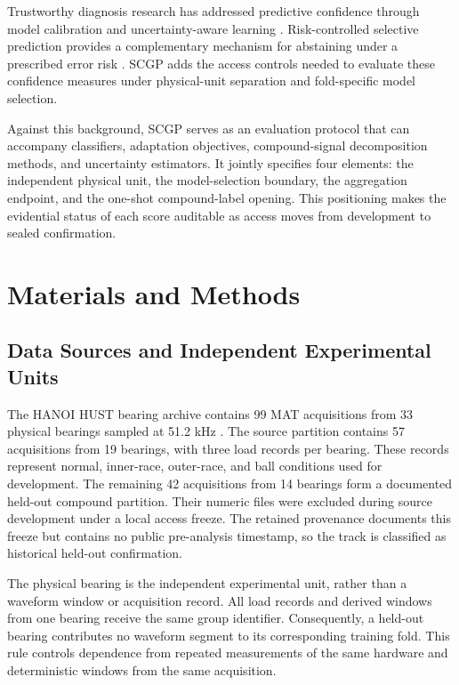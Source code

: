 \documentclass[machines,article,submit,oneauthor,pdftex]{Definitions/mdpi}
\begin{document}
Trustworthy diagnosis research has addressed predictive confidence through model calibration and uncertainty-aware learning \cite{r29,r30,r40}. Risk-controlled selective prediction provides a complementary mechanism for abstaining under a prescribed error risk \cite{r31}. SCGP adds the access controls needed to evaluate these confidence measures under physical-unit separation and fold-specific model selection.

Against this background, SCGP serves as an evaluation protocol that can accompany classifiers, adaptation objectives, compound-signal decomposition methods, and uncertainty estimators. It jointly specifies four elements: the independent physical unit, the model-selection boundary, the aggregation endpoint, and the one-shot compound-label opening. This positioning makes the evidential status of each score auditable as access moves from development to sealed confirmation.

\section{Materials and Methods}

\subsection{Data Sources and Independent Experimental Units}

The HANOI HUST bearing archive contains 99 MAT acquisitions from 33 physical bearings sampled at 51.2 kHz \cite{r01,r45}. The source partition contains 57 acquisitions from 19 bearings, with three load records per bearing. These records represent normal, inner-race, outer-race, and ball conditions used for development. The remaining 42 acquisitions from 14 bearings form a documented held-out compound partition. Their numeric files were excluded during source development under a local access freeze. The retained provenance documents this freeze but contains no public pre-analysis timestamp, so the track is classified as historical held-out confirmation.

The physical bearing is the independent experimental unit, rather than a waveform window or acquisition record. All load records and derived windows from one bearing receive the same group identifier. Consequently, a held-out bearing contributes no waveform segment to its corresponding training fold. This rule controls dependence from repeated measurements of the same hardware and deterministic windows from the same acquisition.
\end{document}
